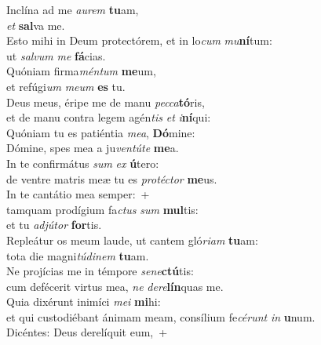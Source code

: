 \evenverse Inclína ad me \textit{au}\textit{rem} \textbf{tu}am,~\*\\
\evenverse \textit{et} \textbf{sal}va me.\\
\oddverse Esto mihi in Deum protectórem, et in lo\textit{cum} \textit{mu}\textbf{ní}tum:~\*\\
\oddverse ut \textit{sal}\textit{vum} \textit{me} \textbf{fá}cias.\\
\evenverse Quóniam firma\textit{mén}\textit{tum} \textbf{me}um,~\*\\
\evenverse et refúgi\textit{um} \textit{me}\textit{um} \textbf{es} tu.\\
\oddverse Deus meus, éripe me de manu \textit{pec}\textit{ca}\textbf{tó}ris,~\*\\
\oddverse et de manu contra legem agén\textit{tis} \textit{et} \textit{i}\textbf{ní}qui:\\
\evenverse Quóniam tu es patiéntia \textit{me}\textit{a}, \textbf{Dó}mine:~\*\\
\evenverse Dómine, spes mea a ju\textit{ven}\textit{tú}\textit{te} \textbf{me}a.\\
\oddverse In te confirmátus \textit{sum} \textit{ex} \textbf{ú}tero:~\*\\
\oddverse de ventre matris meæ tu es \textit{pro}\textit{té}\textit{ctor} \textbf{me}us.\\
\evenverse In te cantátio mea semper:~+\\
\evenverse  tamquam prodígium fa\textit{ctus} \textit{sum} \textbf{mul}tis:~\*\\
\evenverse et tu \textit{ad}\textit{jú}\textit{tor} \textbf{for}tis.\\
\oddverse Repleátur os meum laude, ut cantem gló\textit{ri}\textit{am} \textbf{tu}am:~\*\\
\oddverse tota die magni\textit{tú}\textit{di}\textit{nem} \textbf{tu}am.\\
\evenverse Ne projícias me in témpore \textit{se}\textit{ne}\textbf{ctú}tis:~\*\\
\evenverse cum defécerit virtus mea, \textit{ne} \textit{de}\textit{re}\textbf{lín}quas me.\\
\oddverse Quia dixérunt inimíci \textit{me}\textit{i} \textbf{mi}hi:~\*\\
\oddverse et qui custodiébant ánimam meam, consílium fe\textit{cé}\textit{runt} \textit{in} \textbf{u}num.\\
\evenverse Dicéntes: Deus derelíquit eum,~+\\
